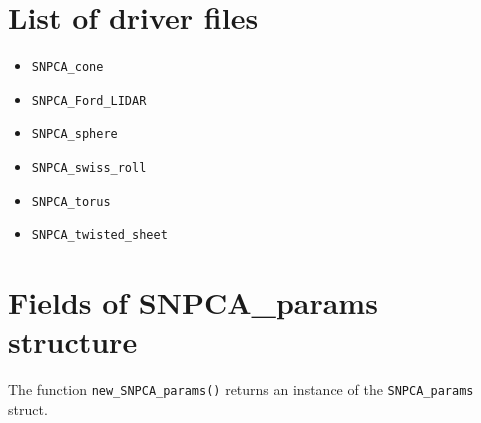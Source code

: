\documentclass[11pt]{amsart}
\begin{document}
\section{List of driver files}
\begin{itemize}
\item
\verb+SNPCA_cone+
\item
\verb+SNPCA_Ford_LIDAR+
\item
\verb+SNPCA_sphere+
\item
\verb+SNPCA_swiss_roll+
\item
\verb+SNPCA_torus+
\item
\verb+SNPCA_twisted_sheet+
\end{itemize}

\section{Fields of SNPCA\_params structure}
\label{sec:snpcaFields}
The function \verb+new_SNPCA_params()+ returns an instance of the \verb+SNPCA_params+ struct.
\end{document}
